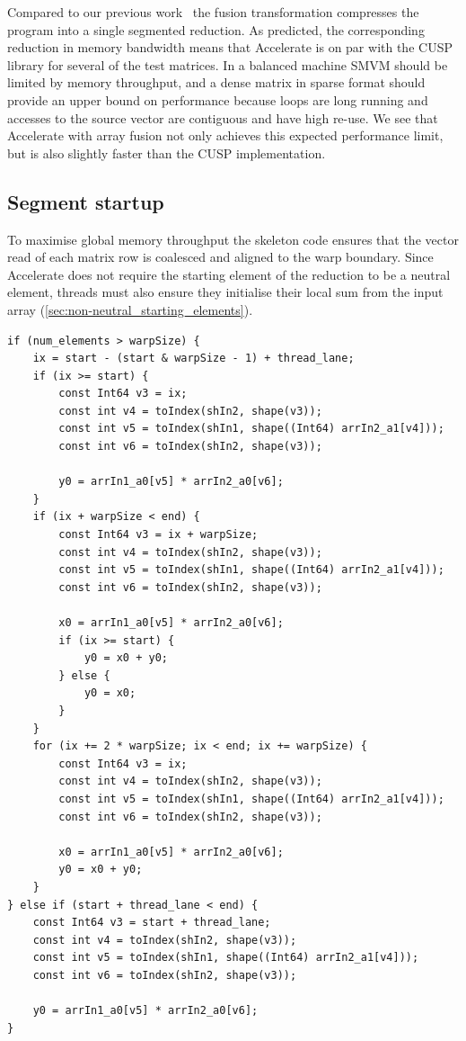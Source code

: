 Compared to our previous work~\cite{Chakravarty:2011fr} the fusion
transformation compresses the program into a single segmented reduction. As
predicted, the corresponding reduction in memory bandwidth means that Accelerate
is on par with the CUSP library for several of the test matrices. In a balanced
machine SMVM should be limited by memory throughput, and a dense matrix in
sparse format should provide an upper bound on performance because loops are
long running and accesses to the source vector are contiguous and have high
re-use. We see that Accelerate with array fusion not only achieves this expected
performance limit, but is also slightly faster than the CUSP implementation.

\subsection{Segment startup}

To maximise global memory throughput the skeleton code ensures that the vector
read of each matrix row is coalesced and aligned to the warp boundary. Since
Accelerate does not require the starting element of the reduction to be a
neutral element, threads must also ensure they initialise their local sum from
the input array (\ref{sec:non-neutral_starting_elements}).


\begin{lstlisting}[style=cuda
    ,float
    ,firstnumber=44
    ,label=lst:smvm_cuda
    ,caption={Generated CUDA code for sparse-matrix vector multiplication}]
if (num_elements > warpSize) {
    ix = start - (start & warpSize - 1) + thread_lane;
    if (ix >= start) {
        const Int64 v3 = ix;
        const int v4 = toIndex(shIn2, shape(v3));
        const int v5 = toIndex(shIn1, shape((Int64) arrIn2_a1[v4]));
        const int v6 = toIndex(shIn2, shape(v3));

        y0 = arrIn1_a0[v5] * arrIn2_a0[v6];
    }
    if (ix + warpSize < end) {
        const Int64 v3 = ix + warpSize;
        const int v4 = toIndex(shIn2, shape(v3));
        const int v5 = toIndex(shIn1, shape((Int64) arrIn2_a1[v4]));
        const int v6 = toIndex(shIn2, shape(v3));

        x0 = arrIn1_a0[v5] * arrIn2_a0[v6];
        if (ix >= start) {
            y0 = x0 + y0;
        } else {
            y0 = x0;
        }
    }
    for (ix += 2 * warpSize; ix < end; ix += warpSize) {
        const Int64 v3 = ix;
        const int v4 = toIndex(shIn2, shape(v3));
        const int v5 = toIndex(shIn1, shape((Int64) arrIn2_a1[v4]));
        const int v6 = toIndex(shIn2, shape(v3));

        x0 = arrIn1_a0[v5] * arrIn2_a0[v6];
        y0 = x0 + y0;
    }
} else if (start + thread_lane < end) {
    const Int64 v3 = start + thread_lane;
    const int v4 = toIndex(shIn2, shape(v3));
    const int v5 = toIndex(shIn1, shape((Int64) arrIn2_a1[v4]));
    const int v6 = toIndex(shIn2, shape(v3));

    y0 = arrIn1_a0[v5] * arrIn2_a0[v6];
}
\end{lstlisting}


